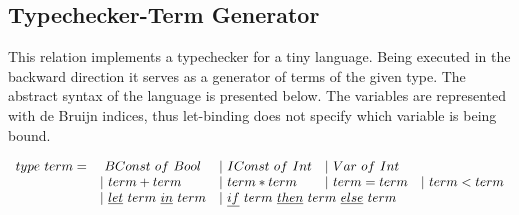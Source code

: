 

\subsection{Typechecker-Term Generator}

This relation implements a typechecker for a tiny language.
Being executed in the backward direction it serves as a generator of terms of the given type.
The abstract syntax of the language is presented below.
The variables are represented with de Bruijn indices, thus let-binding does not specify which variable is being bound.



\[\begin{array}{lllll}
  type \ term = &\ BConst \ of \ Bool &| \ IConst \ of \ Int &| \ Var \ of \ Int & \\
  & | \ term + term &| \ term * term &| \ term = term &| \ term < term \\
  &| \ \underline{let} \ term \ \underline{in} \ term
  &\multicolumn{2}{l}{| \ \underline{if} \ term \ \underline{then} \ term \ \underline{else} \ term} &
\end{array}\]

